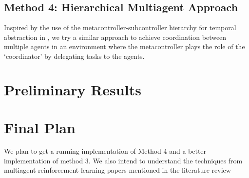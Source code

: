 \documentclass{article}
\begin{document}
\subsection{Method 4: Hierarchical Multiagent Approach}
Inspired by the use of the metacontroller-subcontroller
hierarchy for temporal abstraction in \cite{kulkarni2016hierarchical}, we try a similar approach
to achieve coordination between multiple agents in an
environment where the metacontroller plays the role
of the `coordinator' by delegating
tasks to the agents.

\section{Preliminary Results}

\section{Final Plan}
We plan to get a running implementation of Method 4 and a better implementation of
method 3. We also intend to understand the techniques from multiagent
reinforcement learning papers mentioned in the literature review









\end{document}
